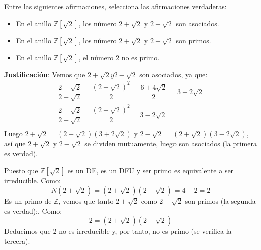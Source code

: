 \begin{ejercicio}
    Entre las siguientes afirmaciones, selecciona las afirmaciones verdaderas:
    \begin{itemize}
        \item \underline{En el anillo $\mathbb{Z}\left[\sqrt{2}\right]$, los número $2+\sqrt{2}$ y $2-\sqrt{2}$ son asociados.}
        \item \underline{En el anillo $\mathbb{Z}\left[\sqrt{2}\right]$, los número $2+\sqrt{2}$ y $2-\sqrt{2}$ son primos.}
        \item \underline{En el anillo $\mathbb{Z}\left[\sqrt{2}\right]$, el número 2 no es primo.}
    \end{itemize}

    \noindent
    \textbf{Justificación}:
    Vemos que $2+\sqrt{2} y 2-\sqrt{2}$ son asociados, ya que:
    \begin{gather*}
        \dfrac{2+\sqrt{2}}{2-\sqrt{2}}=\dfrac{{(2+\sqrt{2})}^{2}}{2}=\dfrac{6+4\sqrt{2}}{2}=3+2\sqrt{2} \\
        \dfrac{2-\sqrt{2}}{2+\sqrt{2}}=\dfrac{{(2-\sqrt{2})}^{2}}{2}=3-2\sqrt{2} \\
    \end{gather*}
    Luego $2+\sqrt{2}=(2-\sqrt{2})(3+2\sqrt{2})$ y $2-\sqrt{2}=(2+\sqrt{2})(3-2\sqrt{2})$, así que $2+\sqrt{2}$ y $2-\sqrt{2}$ se dividen mutuamente, luego son asociados (la primera es verdad).

    Puesto que $\mathbb{Z}\left[\sqrt{2}\right]$ es un DE, es un DFU y ser primo es equivalente a ser irreducible. Como:
    \begin{equation*}
        N\left(2+\sqrt{2}\right) = (2+\sqrt{2})(2-\sqrt{2}) = 4-2 = 2
    \end{equation*}
    Es un primo de $\mathbb{Z}$, vemos que tanto $2+\sqrt{2}$ como $2-\sqrt{2}$ son primos (la segunda es verdad):. Como:
    \begin{equation*}
        2=(2+\sqrt{2})(2-\sqrt{2})
    \end{equation*}
    Deducimos que 2 no es irreducible y, por tanto, no es primo (se verifica la tercera).
\end{ejercicio}


